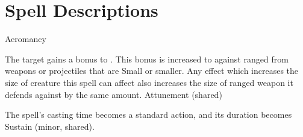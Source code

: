 \section{Spell Descriptions}
\begin{spellsection}{Aeromancy}
\begin{spellheader}
\end{spellheader}
\begin{spellcontent}
\begin{spelltargetinginfo}
\end{spelltargetinginfo}
\begin{spelleffects}
\spelleffect
The target gains a  bonus to .
This bonus is increased to  against ranged  from weapons or projectiles that are Small or smaller.
Any effect which increases the size of creature this spell can affect also increases the size of ranged weapon it defends against by the same amount.
\spelldur Attunement (shared)
\end{spelleffects}
\end{spellcontent}
\begin{spellfooter}
\end{spellfooter}
\begin{spellsubcontent}
\begin{spellcantrip}
The spell's casting time becomes a standard action, and its duration becomes Sustain (minor, shared).
\end{spellcantrip}
\end{spellsubcontent}
\end{spellsection}
